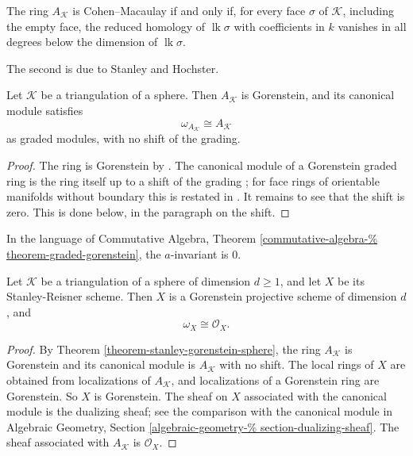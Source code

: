 \begin{theorem}
\label{theorem-reisner-criterion}
The ring $A_{\mathcal{K}}$ is
Cohen--Macaulay if and only if, for
every face $\sigma$ of $\mathcal{K}$,
including the empty face, the reduced
homology of $\operatorname{lk}\sigma$
with coefficients in $k$ vanishes in all
degrees below the dimension of
$\operatorname{lk}\sigma$.
\end{theorem}

The second is due to Stanley and Hochster.

\begin{theorem}
\label{theorem-stanley-gorenstein-sphere}
Let $\mathcal{K}$ be a triangulation of a
sphere. Then $A_{\mathcal{K}}$ is Gorenstein,
and its canonical module satisfies
$$
\omega_{A_{\mathcal{K}}}\cong
A_{\mathcal{K}}
$$
as graded modules, with no shift of the
grading.
\end{theorem}

\begin{proof}
The ring is Gorenstein by \cite[Chapter II,
Corollary 5.2]{stanley-cca}. The canonical
module of a Gorenstein graded ring is the
ring itself up to a shift of the grading
\cite[Chapter I, Theorem 12.5]{stanley-cca};
for face rings of orientable manifolds
without boundary this is restated in
\cite[Chapter II, Section 7]{stanley-cca}. It
remains to see that the shift is zero. This
is done below, in the paragraph on the shift.
\end{proof}

In the language of Commutative Algebra,
Theorem
\ref{commutative-algebra-%
theorem-graded-gorenstein},
the $a$-invariant is $0$.

\begin{corollary}
\label{corollary-sr-sphere-trivial-dualizing}
Let $\mathcal{K}$ be a triangulation of
a sphere of dimension $d\geq 1$, and let
$X$ be its Stanley-Reisner scheme. Then
$X$ is a Gorenstein projective scheme of
dimension $d$, and
$$
\omega_X\cong\mathcal{O}_X.
$$
\end{corollary}

\begin{proof}
By Theorem
\ref{theorem-stanley-gorenstein-sphere},
the ring $A_{\mathcal{K}}$ is Gorenstein
and its canonical module is
$A_{\mathcal{K}}$ with no shift. The
local rings of $X$ are obtained from
localizations of $A_{\mathcal{K}}$, and
localizations of a Gorenstein ring are
Gorenstein. So $X$ is Gorenstein. The
sheaf on $X$ associated with the
canonical module is the dualizing sheaf;
see the comparison with the canonical
module in Algebraic Geometry, Section
\ref{algebraic-geometry-%
section-dualizing-sheaf}. The sheaf
associated with $A_{\mathcal{K}}$ is
$\mathcal{O}_X$.
\end{proof}

